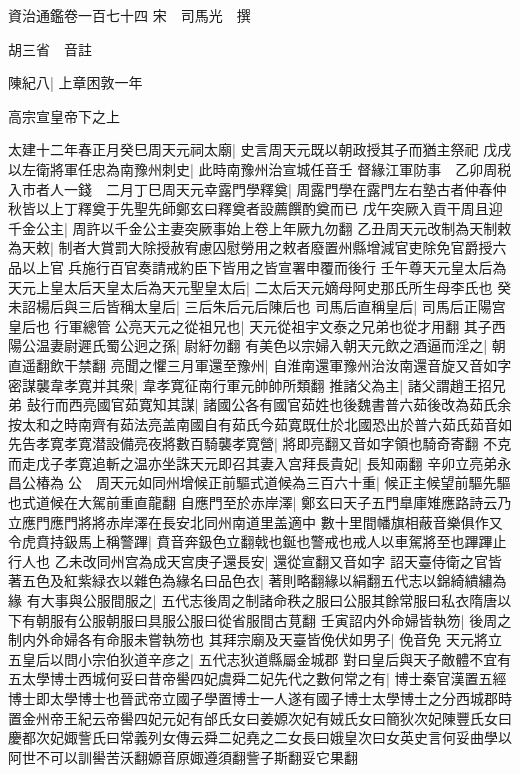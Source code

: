 資治通鑑卷一百七十四
宋　司馬光　撰

胡三省　音註

陳紀八|{
	上章困敦一年}


高宗宣皇帝下之上

太建十二年春正月癸巳周天元祠太廟|{
	史言周天元既以朝政授其子而猶主祭祀}
戊戌以左衛將軍任忠為南豫州刺史|{
	此時南豫州治宣城任音壬}
督緣江軍防事　乙卯周税入市者人一錢　二月丁巳周天元幸露門學釋奠|{
	周露門學在露門左右塾古者仲春仲秋皆以上丁釋奠于先聖先師鄭玄曰釋奠者設薦饌酌奠而已}
戊午突厥入貢干周且迎千金公主|{
	周許以千金公主妻突厥事始上卷上年厥九勿翻}
乙丑周天元改制為天制敕為天敕|{
	制者大賞罰大除授赦宥慮囚慰勞用之敕者廢置州縣增減官吏除免官爵授六品以上官兵施行百官奏請戒約臣下皆用之皆宣署申覆而後行}
壬午尊天元皇太后為天元上皇太后天皇太后為天元聖皇太后|{
	二太后天元嫡母阿史那氏所生母李氏也}
癸未詔楊后與三后皆稱太皇后|{
	三后朱后元后陳后也}
司馬后直稱皇后|{
	司馬后正陽宫皇后也}
行軍總管公亮天元之從祖兄也|{
	天元從祖宇文泰之兄弟也從才用翻}
其子西陽公温妻尉遲氏蜀公迥之孫|{
	尉紆勿翻}
有美色以宗婦入朝天元飲之酒逼而淫之|{
	朝直遥翻飲干禁翻}
亮聞之懼三月軍還至豫州|{
	自淮南還軍豫州治汝南還音旋又音如字}
密謀襲韋孝寛并其衆|{
	韋孝寛征南行軍元帥帥所類翻}
推諸父為主|{
	諸父謂趙王招兄弟}
鼔行而西亮國官茹寛知其謀|{
	諸國公各有國官茹姓也後魏書普六茹後改為茹氏余按太和之時南齊有茹法亮盖南國自有茹氏今茹寛既仕於北國恐出於普六茹氏茹音如}
先告孝寛孝寛潜設備亮夜將數百騎襲孝寛營|{
	將即亮翻又音如字領也騎奇寄翻}
不克而走戊子孝寛追斬之温亦坐誅天元即召其妻入宫拜長貴妃|{
	長知兩翻}
辛卯立亮弟永昌公椿為公　周天元如同州增候正前驅式道候為三百六十重|{
	候正主候望前驅先驅也式道候在大駕前重直龍翻}
自應門至於赤岸澤|{
	鄭玄曰天子五門臯庫雉應路詩云乃立應門應門將將赤岸澤在長安北同州南道里盖適中}
數十里間幡旗相蔽音樂俱作又令虎賁持鈒馬上稱警蹕|{
	賁音奔鈒色立翻戟也鋋也警戒也戒人以車駕將至也蹕蹕止行人也}
乙未改同州宫為成天宫庚子還長安|{
	還從宣翻又音如字}
詔天臺侍衛之官皆著五色及紅紫緑衣以雜色為緣名曰品色衣|{
	著則略翻緣以絹翻五代志以錦綺繢繡為緣}
有大事與公服間服之|{
	五代志後周之制諸命秩之服曰公服其餘常服曰私衣隋唐以下有朝服有公服朝服曰具服公服曰從省服間古莧翻}
壬寅詔内外命婦皆執笏|{
	後周之制内外命婦各有命服未嘗執笏也}
其拜宗廟及天臺皆俛伏如男子|{
	俛音免}
天元將立五皇后以問小宗伯狄道辛彦之|{
	五代志狄道縣屬金城郡}
對曰皇后與天子敵體不宜有五太學博士西城何妥曰昔帝嚳四妃虞舜二妃先代之數何常之有|{
	博士秦官漢置五經博士即太學博士也晉武帝立國子學置博士一人遂有國子博士太學博士之分西城郡時置金州帝王紀云帝嚳四妃元妃有邰氏女曰姜嫄次妃有娀氏女曰簡狄次妃陳豐氏女曰慶都次妃娵訾氏曰常義列女傳云舜二妃堯之二女長曰娥皇次曰女英史言何妥曲學以阿世不可以訓嚳苦沃翻嫄音原娵遵須翻訾子斯翻妥它果翻}
